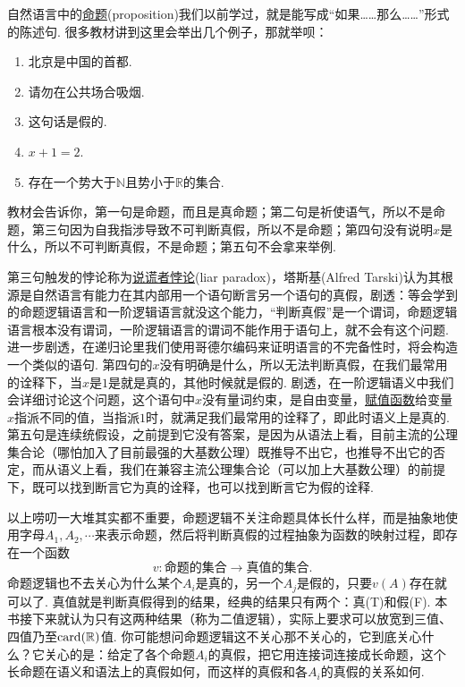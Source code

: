自然语言中的\underline{命题}(proposition)我们以前学过，就是能写成“如果……那么……”形式的陈述句. 很多教材讲到这里会举出几个例子，那就举呗：
\begin{enumerate}
    \item 北京是中国的首都.
    \item 请勿在公共场合吸烟.
    \item 这句话是假的.
    \item \(x+1=2\).
    \item 存在一个势大于\(\mathbb{N}\)且势小于\(\mathbb{R}\)的集合.
\end{enumerate}
教材会告诉你，第一句是命题，而且是真命题；第二句是祈使语气，所以不是命题，第三句因为自我指涉导致不可判断真假，所以不是命题；第四句没有说明\(x\)是什么，所以不可判断真假，不是命题；第五句不会拿来举例.
\begin{note}
    第三句触发的悖论称为\underline{说谎者悖论}(liar paradox)，塔斯基(Alfred Tarski)认为其根源是自然语言有能力在其内部用一个语句断言另一个语句的真假，剧透：等会学到的命题逻辑语言和一阶逻辑语言就没这个能力，“判断真假”是一个谓词，命题逻辑语言根本没有谓词，一阶逻辑语言的谓词不能作用于语句上，就不会有这个问题. 进一步剧透，在递归论里我们使用哥德尔编码来证明语言的不完备性时，将会构造一个类似的语句. 第四句的\(x\)没有明确是什么，所以无法判断真假，在我们最常用的诠释下，当\(x\)是\(1\)是就是真的，其他时候就是假的. 剧透，在一阶逻辑语义中我们会详细讨论这个问题，这个语句中\(x\)没有量词约束，是自由变量，\underline{赋值函数}给变量\(x\)指派不同的值，当指派\(1\)时，就满足我们最常用的诠释了，即此时语义上是真的. 第五句是连续统假设，之前提到它没有答案，是因为从语法上看，目前主流的公理集合论（哪怕加入了目前最强的大基数公理）既推导不出它，也推导不出它的否定，而从语义上看，我们在兼容主流公理集合论（可以加上大基数公理）的前提下，既可以找到断言它为真的诠释，也可以找到断言它为假的诠释. 
\end{note}

以上唠叨一大堆其实都不重要，命题逻辑不关注命题具体长什么样，而是抽象地使用字母\(A_1, A_2, \cdots\)来表示命题，然后将判断真假的过程抽象为函数的映射过程，即存在一个函数
\[v: \mbox{命题的集合} \to \mbox{真值的集合}.\] 
命题逻辑也不去关心为什么某个\(A_i\)是真的，另一个\(A_j\)是假的，只要\(v(A)\)存在就可以了. 真值就是判断真假得到的结果，经典的结果只有两个：真(T)和假(F). 本书接下来就认为只有这两种结果（称为二值逻辑），实际上要求可以放宽到三值、四值乃至\({\rm card}(\mathbb{R})\)值. 你可能想问命题逻辑这不关心那不关心的，它到底关心什么？它关心的是：给定了各个命题\(A_i\)的真假，把它用连接词连接成长命题，这个长命题在语义和语法上的真假如何，而这样的真假和各\(A_i\)的真假的关系如何. 

